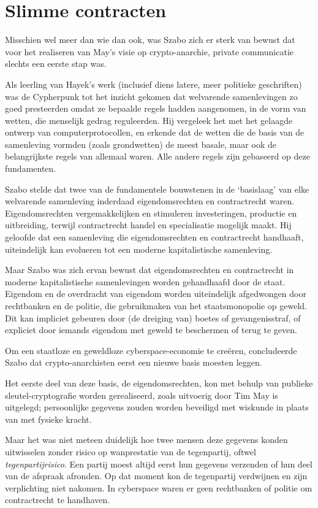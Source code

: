\documentclass[smalldemyvopaper,11pt,twoside,onecolumn,openright,extrafontsizes,hidelinks]{memoir}
\begin{document}
\section{Slimme contracten}\label{slimme-contracten}

Misschien wel meer dan wie dan ook, was Szabo zich er sterk van bewust
dat voor het realiseren van May's visie op crypto-anarchie, private
communicatie slechts een eerste stap was.

Als leerling van Hayek's werk (inclusief diens latere, meer politieke
geschriften) was de Cypherpunk tot het inzicht gekomen dat welvarende
samenlevingen zo goed presteerden omdat ze bepaalde regels hadden
aangenomen, in de vorm van wetten, die menselijk gedrag reguleerden. Hij
vergeleek het met het gelaagde ontwerp van computerprotocollen, en
erkende dat de wetten die de basis van de samenleving vormden (zoals
grondwetten) de meest basale, maar ook de belangrijkste regels van
allemaal waren. Alle andere regels zijn gebaseerd op deze fundamenten.

Szabo stelde dat twee van de fundamentele bouwstenen in de `basislaag'
van elke welvarende samenleving inderdaad eigendomsrechten en
contractrecht waren. Eigendomsrechten vergemakkelijken en stimuleren
investeringen, productie en uitbreiding, terwijl contractrecht handel en
specialisatie mogelijk maakt. Hij geloofde dat een samenleving die
eigendomsrechten en contractrecht handhaaft, uiteindelijk kan evolueren
tot een moderne kapitalistische samenleving.

Maar Szabo was zich ervan bewust dat eigendomsrechten en contractrecht
in moderne kapitalistische samenlevingen worden gehandhaafd door de
staat. Eigendom en de overdracht van eigendom worden uiteindelijk
afgedwongen door rechtbanken en de politie, die gebruikmaken van het
staatsmonopolie op geweld. Dit kan impliciet gebeuren door (de dreiging
van) boetes of gevangenisstraf, of expliciet door iemands eigendom met
geweld te beschermen of terug te geven.

Om een staatloze en geweldloze cyberspace-economie te creëren,
concludeerde Szabo dat crypto-anarchisten eerst een nieuwe basis moesten
leggen.

Het eerste deel van deze basis, de eigendomsrechten, kon met behulp van
publieke sleutel-cryptografie worden gerealiseerd, zoals uitvoerig door
Tim May is uitgelegd; persoonlijke gegevens zouden worden beveiligd met
wiskunde in plaats van met fysieke kracht.

Maar het was niet meteen duidelijk hoe twee mensen deze gegevens konden
uitwisselen zonder risico op wanprestatie van de tegenpartij, oftwel
\emph{tegenpartijrisico}. Een partij moest altijd eerst hun gegevens
verzenden of hun deel van de afspraak afronden. Op dat moment kon de
tegenpartij verdwijnen en zijn verplichting niet nakomen. In cyberspace
waren er geen rechtbanken of politie om contractrecht te handhaven.
\end{document}

